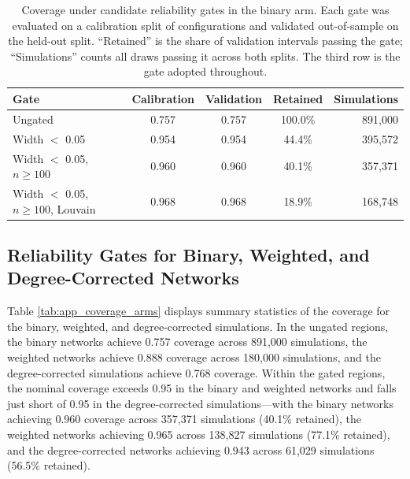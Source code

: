 \documentclass[11pt, letterpaper]{article}
\numberwithin{equation}{section}
\begin{document}
\begin{table}[ht]\centering
\footnotesize
\caption{Coverage under candidate reliability gates in the binary arm. Each
gate was evaluated on a calibration split of configurations and validated
out-of-sample on the held-out split. ``Retained'' is the share of validation
intervals passing the gate; ``Simulations'' counts all draws passing it across
both splits. The third row is the gate adopted throughout.}
\label{tab:coverage_gate}
\begin{tabular}{lcccr}
\toprule
Gate & Calibration & Validation & Retained & Simulations \\
\midrule
Ungated & 0.757 & 0.757 & 100.0\% & 891,000 \\
Width $<$ 0.05 & 0.954 & 0.954 & 44.4\% & 395,572 \\
Width $<$ 0.05, $n \geq 100$ & 0.960 & 0.960 & 40.1\% & 357,371 \\
Width $<$ 0.05, $n \geq 100$, Louvain & 0.968 & 0.968 & 18.9\% & 168,748 \\
\bottomrule
\end{tabular}
\end{table}

\subsection{Reliability Gates for Binary, Weighted, and Degree-Corrected Networks}
Table \ref{tab:app_coverage_arms} displays summary statistics of the coverage for the binary, weighted, and degree-corrected simulations. In the ungated regions, the binary networks achieve 0.757 coverage across 891,000 simulations, the weighted networks achieve 0.888 coverage across 180,000 simulations, and the degree-corrected simulations achieve 0.768 coverage. Within the gated regions, the nominal coverage exceeds 0.95 in the binary and weighted networks and falls just short of 0.95 in the degree-corrected simulations---with the binary networks achieving 0.960 coverage across 357,371 simulations (40.1\% retained), the weighted networks achieving 0.965 across 138,827 simulations (77.1\% retained), and the degree-corrected networks achieving 0.943 across 61,029 simulations (56.5\% retained). 
\end{document}
